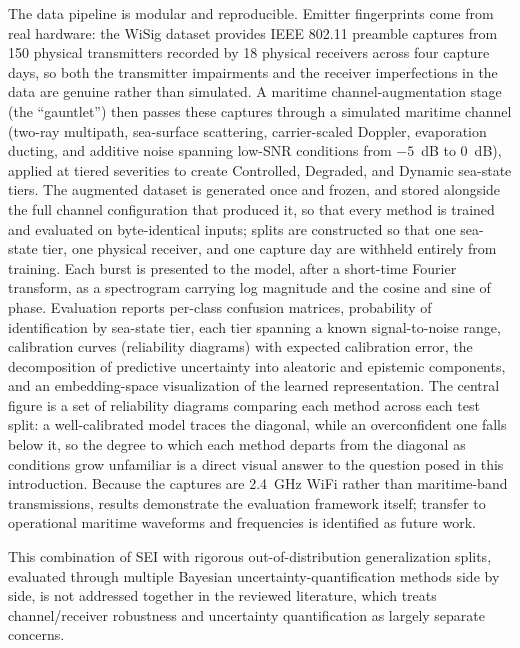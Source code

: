 \documentclass{article}
\begin{document}
The data pipeline is modular and reproducible. Emitter fingerprints come from real
hardware: the WiSig dataset \citep{hanna2022} provides IEEE 802.11 preamble captures from
150 physical transmitters recorded by 18 physical receivers across four capture days, so
both the transmitter impairments and the receiver imperfections in the data are genuine
rather than simulated. A maritime channel-augmentation stage (the ``gauntlet'') then
passes these captures through a simulated maritime channel (two-ray multipath,
sea-surface scattering, carrier-scaled Doppler, evaporation ducting, and additive noise
spanning low-SNR conditions from $-5$~dB to $0$~dB), applied at tiered severities to create
Controlled, Degraded, and Dynamic sea-state tiers. The augmented dataset is generated once
and frozen, and stored alongside the full channel configuration that produced it, so that
every method is trained and evaluated on byte-identical inputs; splits are
constructed so that one sea-state tier, one physical receiver, and one capture day are
withheld entirely from training. Each burst is presented to the model, after a short-time
Fourier transform, as a spectrogram carrying log magnitude and the cosine and sine of
phase.
Evaluation reports per-class confusion matrices,
probability of identification by sea-state tier, each tier spanning a known
signal-to-noise range, calibration curves (reliability
diagrams) with expected calibration error, the decomposition of predictive uncertainty
into aleatoric and epistemic components, and an embedding-space visualization of the
learned representation.
The central figure is a set of reliability diagrams comparing each method across each test
split: a well-calibrated model traces the diagonal, while an overconfident one falls below
it, so the degree to which each method departs from the diagonal as conditions grow
unfamiliar is a direct visual answer to the question posed in this introduction.
Because the captures are 2.4~GHz WiFi rather than maritime-band transmissions, results
demonstrate the evaluation framework itself; transfer to operational maritime waveforms
and frequencies is identified as future work.

This combination of SEI with rigorous out-of-distribution generalization splits,
evaluated through multiple Bayesian uncertainty-quantification methods side by side,
is not addressed together in the reviewed literature, which treats channel/receiver
robustness and uncertainty quantification as largely separate concerns.

\end{document}
